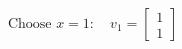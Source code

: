 \documentclass{article}
\begin{document}
\begin{align*}
\text{Choose } x=1: \quad\boxed{v_1 = \begin{bmatrix} 1 \\ 1 \end{bmatrix}}
\end{align*}
\end{document}
